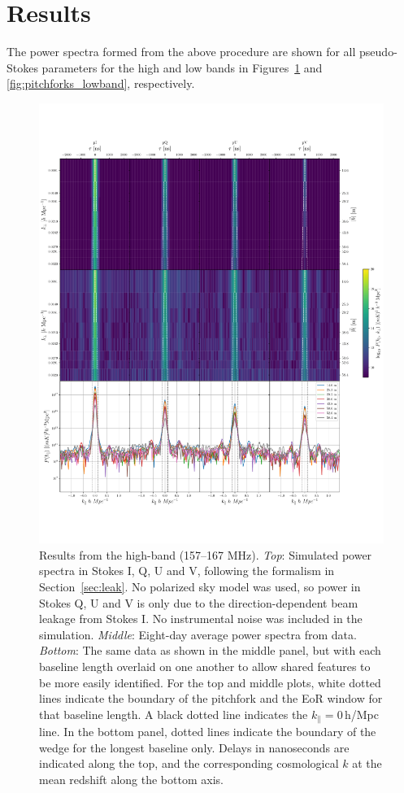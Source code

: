 \documentclass[twocolumn, trackchanges]{aastex61}
\begin{document}
\section{Results}
\label{sec:results}

The power spectra formed from the above procedure are shown for all
pseudo-Stokes parameters for the high and low bands in
Figures~\ref{fig:pitchforks_highband} and \ref{fig:pitchforks_lowband},
respectively.

\begin{figure}[h]
\centering
\includegraphics[scale=0.45]{highband_8day_LST_105_230.pdf}
\caption{Results from the high-band (157--167 MHz).  \textit{Top}: Simulated
  power spectra in Stokes I, Q, U and V, following the formalism in
  Section~\ref{sec:leak}.  No polarized sky model was used, so power in Stokes
  Q, U and V is only due to the direction-dependent beam leakage from Stokes I.
  No instrumental noise was included in the simulation. \textit{Middle}:
  Eight-day average power spectra from data. \textit{Bottom}: The same data as
  shown in the middle panel, but with each baseline length overlaid on one
  another to allow shared features to be more easily identified.  For the top
  and middle plots, white dotted lines indicate the boundary of the pitchfork
  and the EoR window for that baseline length. A black dotted line indicates the
  $k_{\parallel}=0$\,h/Mpc line.  In the bottom panel, dotted lines indicate the
  boundary of the wedge for the longest baseline only.  Delays in nanoseconds
  are indicated along the top, and the corresponding cosmological $k$ at the
  mean redshift along the bottom axis.}
\label{fig:pitchforks_highband}
\end{figure}
\end{document}
